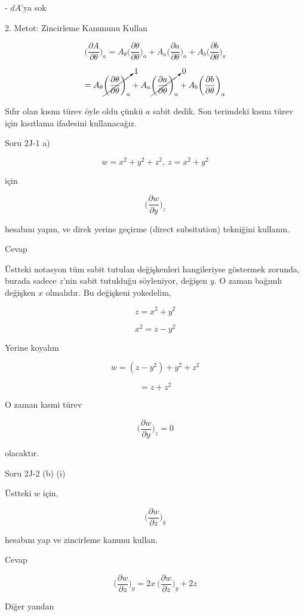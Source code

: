 \documentclass[12pt,fleqn]{article}\usepackage{../../common}
\begin{document}
- $dA$'ya sok

2. Metot: Zincirleme Kanununu Kullan

$$ \bigg( \frac{\partial A}{\partial \theta} \bigg)_{a} = 
A_\theta \bigg( \frac{\partial \theta}{\partial \theta} \bigg)_{a} + 
A_a \bigg( \frac{\partial a}{\partial \theta} \bigg)_{a} + 
A_b \bigg( \frac{\partial b}{\partial \theta} \bigg)_{a} 
$$

$$  = 
A_\theta \cancelto{1}{\bigg( \frac{\partial \theta}{\partial \theta} \bigg)_{a}} 
+ 
A_a \cancelto{0}{\bigg( \frac{\partial a}{\partial \theta} \bigg)_{a}} + 
A_b \bigg( \frac{\partial b}{\partial \theta} \bigg)_{a}
$$

Sıfır olan kısmı türev öyle oldu çünkü $a$ sabit dedik. Son terimdeki
kısmı türev için kısıtlama ifadesini kullanacağız.

Soru 2J-1 a)

$$ w = x^2+y^2+z^2, \ z = x^2+y^2 $$

için 

$$ \bigg( \frac{\partial w}{\partial y}  \bigg)_z $$

hesabını yapın, ve direk yerine geçirme (direct subsitution) tekniğini
kullanın. 

Cevap 

Üstteki notasyon tüm sabit tutulan değişkenleri hangileriyse göstermek
zorunda, burada sadece $z$'nin sabit tutulduğu söyleniyor, değişen $y$. O
zaman bağımlı değişken $x$ olmalıdır. Bu değişkeni yokedelim,

$$ z = x^2+y^2 $$

$$ x^2 = z - y^2 $$

Yerine koyalım

$$  w = (z-y^2)+y^2+z^2 $$

$$ = z + z^2 $$

O zaman kısmi türev

$$ \bigg( \frac{\partial w}{\partial y}  \bigg)_z  = 0$$

olacaktır. 

Soru 2J-2 (b) (i)

Üstteki $w$ için, 

$$ \bigg( \frac{\partial w}{\partial z}  \bigg)_y $$

hesabını yap ve zincirleme kanunu kullan. 

Cevap 

$$  \bigg( \frac{\partial w}{\partial z}  \bigg)_y  =
2x \  \bigg( \frac{\partial w}{\partial z}  \bigg)_y  +  2z
$$

Diğer yandan 
\end{document}
